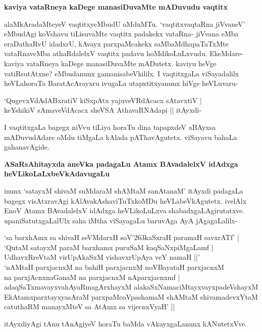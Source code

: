\noindent
{\bf\large{kaviya vataRneya kaDege manasiDuvaMte mADuvudu vaqtitx}}\label{page245}

alaMkAradaMteyeV vaqtitxyeMbudU oMduMTu. `vaqtitxvaqtaRna jiVvaneV' eMbudAgi koVshavu tiLisuvaMte vaqtitx padakekx vataRna- jiVvana eMba eraDathaRvU idadxrU, kAvayx parxpaMcakekx saMbaMdhapaTaTxMte vataRnaveMba athaRdalelxV vaqtitx padavu hoMdikoLuLxvudu. EkeMdare- kaviya vataRneya kaDege manasiDuvaMte mADutetx. kaviyu heVge vatiRsutAtxne? eMbudanunx gamanisabeVkililx. I vaqtitxgaLa viSayadalilx heVLahoraTa BaratAcArayxru ivugaLa utapxtitxyanunx hiVge heVLuvaru-

\begin{shloka}
`QugevxVdAdABxratiV kiSxpAtx yajuveVRdAcacx sAtavxtiV |\\\label{245}
keYshikiV sAmaveVdAcacx sheVSA AthavaRNAdapi || itAyxdi-
\end{shloka}

I vaqtitxgaLa bagegx niVvu tiLiya horaTu dina tapapxdeV aBAyxsa mADuvudAdare oMdu tiMgaLa kAlada pAThavAgutetx. viSayavu bahaLa gahanavAgide.

\noindent
{\bf\large{ASaRsAhitayxda aneVka padagaLu Atamx BAvadalelxV idAdxga heVLikoLaLxbeVkAdavugaLu}}

inunx `satayxM shivaM suMdaraM shAMtaM sanAtanaM' itAyxdi padagaLa bagegx visAtxravAgi kAlAvakAshaviTuTxkoMDu heVLabeVkAgutetx. ivelAlx EnoV Atamx BAvadalelxV idAdxga heVLikoLuLxva shabadxgaLAgirutatxve. upaniSatutxgaLalUlx saha iMtha viSayagaLu baruvAga AyA jAgagaLalilx-

\begin{shloka}
`sa barxhAmx sa shivaH seVMdarxH soV\char'263kaSxraH paramaH savxrATf' |\\\label{246}
`QutaM satayxM paraM barxhamx puruSaM kaqSaNxpiMgaLamf |\\\label{246}
UdhavxRreVtaM virUpAkaSxM vishavxrUpAya veY namaH ||'\\
`nAMtaH parxjacnxM na bahiH parxjacnxM noVBayataH parxjacnxM \\\label{246}
na parxjAcnxnaGanaM na parxjacnxM nAparxjacnxmf |\\
adaqSaTxmavayxvahAyaRmagArxhayxM alakaSxNamaciMtayxvayxpadeVshayxM \\
EkAtamxparxtayxyasAraM parxpaMcoVpashamaM shAMtaM shivamadevxYtaM \\
catuthaRM manayxMteV sa AtAmx sa vijecnxVyaH' ||
\end{shloka}

itAyxdiyAgi tAnu tAnAgiyeV horaTu baMda vAkayxgaLanunx kANutetxVve.

